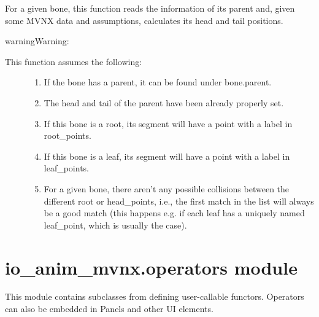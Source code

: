 \documentclass[letterpaper,10pt,english,openany,oneside]{sphinxmanual}
\begin{document}
\begin{fulllineitems}
For a given bone, this function reads the information of its parent and,
given some MVNX data and assumptions, calculates its head and tail
positions.

\begin{sphinxadmonition}{warning}{Warning:}\begin{description}
\item[{This function assumes the following:}] \leavevmode\begin{enumerate}
\def\theenumi{\arabic{enumi}}
\def\labelenumi{\theenumi .}
\makeatletter\def\p@enumii{\p@enumi \theenumi .}\makeatother
\item {} 
If the bone has a parent, it can be found under bone.parent.

\item {} 
The head and tail of the parent have been already properly set.

\item {} 
If this bone is a root, its segment will have a point with
a label in root\_points.

\item {} 
If this bone is a leaf, its segment will have a point with
a label in leaf\_points.

\item {} 
For a given bone, there aren’t any possible collisions between the
different root or head\_points, i.e., the first match in the list
will always be a good match (this happens e.g. if each leaf has
a uniquely named leaf\_point, which is usually the case).

\end{enumerate}

\end{description}
\end{sphinxadmonition}

\end{fulllineitems}



\section{io\_anim\_mvnx.operators module}
\label{\detokenize{io_anim_mvnx:module-io_anim_mvnx.operators}}\label{\detokenize{io_anim_mvnx:io-anim-mvnx-operators-module}}
This module contains subclasses from  defining
user-callable functors. Operators can also be embedded in Panels and
other UI elements.
\end{document}
